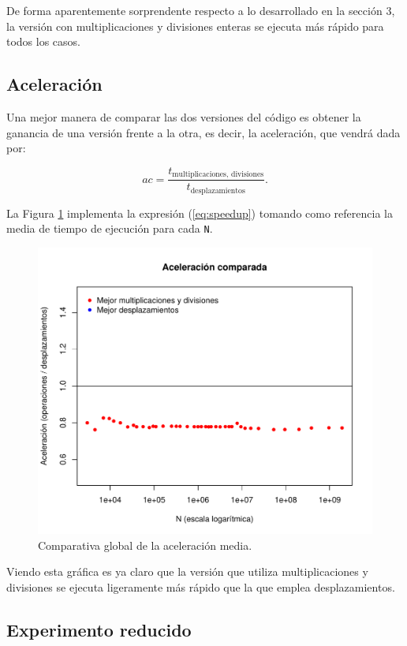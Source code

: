 \documentclass[11pt,a4paper,twoside]{article}
\theoremstyle{definition}
\begin{document}
	De forma aparentemente sorprendente respecto a lo desarrollado en la sección 3, la versión con multiplicaciones y divisiones enteras se ejecuta más rápido para todos los casos.
	
	\subsection{Aceleración}
	
	Una mejor manera de comparar las dos versiones del código es obtener la ganancia de una versión frente a la otra, es decir, la aceleración, que vendrá dada por:
	
	\begin{equation} \label{eq:speedup}
		ac = \dfrac{t_{\text{multiplicaciones, divisiones}}}{t_{\text{desplazamientos}}}.
	\end{equation}

	La Figura \ref{graf:speedup} implementa la expresión (\ref{eq:speedup}) tomando como referencia la media de tiempo de ejecución para cada \texttt{N}.
	
	\begin{figure} [H] \centering
		\includegraphics[width=.8\textwidth]{../graficas/NOCHE_speedup.pdf}
		\caption{Comparativa global de la aceleración media.}
		\label{graf:speedup}
	\end{figure}

	Viendo esta gráfica es ya claro que la versión que utiliza multiplicaciones y divisiones se ejecuta ligeramente más rápido que la que emplea desplazamientos.
	
	\subsection{Experimento reducido}
	
\end{document}
